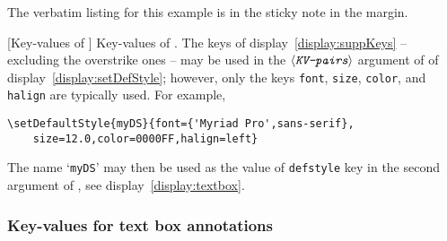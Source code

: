 \documentclass[12pt]{article}
\makeatletter
\let\opt\texttt
\def\ameta#1{$\langle\textit{\texttt{#1}}\rangle$}
\let\amtIndent\leftmargini
\renewenvironment{quote}[1][]
   {\def\@rgi{#1}\ifx\@rgi\@empty
    \let\rghtm\@empty\else\def\rghtm{\rightmargin\leftmargin}\fi
    \list{}{\rghtm} %
    \item\relax}
   {\endlist}
\renewcommand*{\theparagraph}{\texorpdfstring{\protect\P\protect\ }{\textparagraph}}
\renewcommand{\paragraph}
    {\renewcommand{\@seccntformat}[1]{\theparagraph}%
    \@startsection{paragraph}{4}{0pt}{6pt}{-3pt}{\color{\aeb@subsubsectioncolor}\bfseries}}
\def\chgCurrLblName#1{\def\@currentlabelname{#1}}
\makeatother
\begin{document}
\begin{quote}
\begin{textboxpara}
\end{textboxpara}
%
\annotpro[margin,readonly,margintext={\centering The Code}]{\annotextboxi}%
\end{quote}
The verbatim listing for this example is in the sticky note in the margin.

\paragraph[Key-values of \texorpdfstring{\protect{}}{\textbackslash{setDefaultStyle}}]%
{Key-values of .}%
\chgCurrLblName{Key-values of \cs{setDefaultStyle}}\label{para:KeysDS} The
keys of display~\eqref{display:suppKeys} -- excluding the overstrike ones --
may be used in the \ameta{KV-pairs} argument of  of
display~\eqref{display:setDefStyle}; however, only the keys \opt{font},
\opt{size}, \opt{color}, and \opt{halign} are typically used. For example,
\begin{Verbatim}[xleftmargin=\amtIndent,fontsize=\small,commandchars=!()]
\setDefaultStyle{myDS}{font={'Myriad Pro',sans-serif},
    size=12.0,color=0000FF,halign=left}
\end{Verbatim}
The name `\opt{myDS}' may then be used as the value of \opt{defstyle} key in the second argument
of , see display~\eqref{display:textbox}.

\subsubsection{Key-values for text box annotations}
\end{document}
